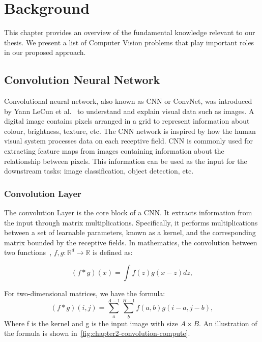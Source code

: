 \chapter{Background}
\label{chapter-background}
\begin{ChapAbstract}
This chapter provides an overview of the fundamental knowledge relevant to our thesis. We present a list of Computer Vision problems that play important roles in our proposed approach.
\end{ChapAbstract}

\section{Convolution Neural Network}
Convolutional neural network, also known as CNN or ConvNet, was introduced by Yann LeCun et al.~\cite{LeCun-NC1989-Backpropagation} to understand and explain visual data such as images. A digital image contains pixels arranged in a grid to represent information about colour, brightness, texture, etc. The CNN network is inspired by how the human visual system processes data on each receptive field. CNN is commonly used for extracting feature maps from images containing information about the relationship between pixels. This information can be used as the input for the downstream tasks: image classification, object detection, etc.

\subsection{Convolution Layer}
The convolution Layer is the core block of a CNN. It extracts information from the input through matrix multiplications. Specifically, it performs multiplications between a set of learnable parameters, known as a kernel, and the corresponding matrix bounded by the receptive fields. In mathematics, the convolution between two functions~\cite{Rudin-McGrawHill1991-Functional}, $f, g: \mathbb{R}^d \rightarrow \mathbb{R}$ is defined as:

\begin{equation}
    (f \ast g)(x) = \int f(z)g(x - z)dz,
\end{equation}

For two-dimensional matrices, we have the formula:
\begin{equation}
    (f \ast g)(i, j) = \sum_{a}^{A-1}\sum_{b}^{B-1}f(a, b)g(i - a, j - b),
\end{equation}
Where f is the kernel and g is the input image with size $A \times B$. An illustration of the formula is shown in~\autoref{fig:chapter2-convolution-compute}.

